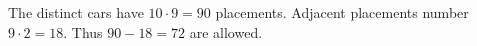 The distinct cars have $10\cdot9=90$ placements. Adjacent placements number $9\cdot2=18$. Thus $90-18=\boxed{72}$ are allowed.
